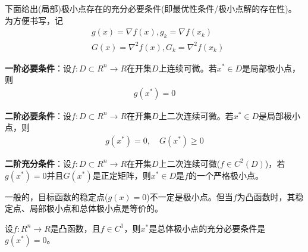         \par
        下面给出(局部)极小点存在的充分必要条件(即最优性条件/极小点解的存在性)。为方便书写，记
        \begin{align*}
        & g(x) = \nabla f(x),g_k=\nabla f(x_k)\\
        & G(x)={\nabla^2} f(x),G_k={\nabla^2} f(x_k)
        \end{align*}
        \par
        \textbf{一阶必要条件}：设$f:D\subset R^n \to R$在开集$D$上连续可微。若$x^{*} \in D$是局部极小点，则
        \begin{align*}
          g(x^{*}) = 0
        \end{align*}
        \par
        \textbf{二阶必要条件}：设$f:D\subset R^n \to R$在开集$D$上二次连续可微。若$x^{*} \in D$是局部极小点，则
        \begin{align*}
          g(x^{*}) = 0,\quad G(x^*) \ge 0
        \end{align*}
        \par
        \textbf{二阶充分条件}：设$f:D\subset R^n \to R$在开集$D$上二次连续可微($f \in C^2(D)$)，若$g(x^{*})=0$并且$G(x^{*})$是正定矩阵，则$x^{*} \in D$是$f$的一个严格极小点。
        \par
        一般的，目标函数的稳定点($g(x)=0$)不一定是极小点。但当$f$为凸函数时，其稳定点、局部极小点和总体极小点是等价的。
        \par
        设$f:R^n \to R$是凸函数，且$f \in C^{1}$，则$x^{*}$是总体极小点的充分必要条件是$g(x^{*})=0$。
